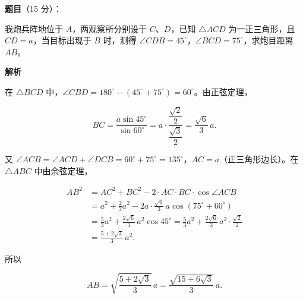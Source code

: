 \begin{answer}

\textbf{题目}（15 分）：

我炮兵阵地位于 $A$，两观察所分别设于 $C$、$D$，已知 $\triangle ACD$ 为一正三角形，且 $CD=a$，当目标出现于 $B$ 时，测得 $\angle CDB=45^\circ$，$\angle BCD=75^\circ$，求炮目距离 $AB$。
\nopagebreak[4]
\begin{center}\end{center}
\nopagebreak[4]
\textbf{解析}
\nopagebreak[4]
\begin{center}\end{center}
\nopagebreak[4]
在 $\triangle BCD$ 中，$\angle CBD=180^\circ-(45^\circ+75^\circ)=60^\circ$。由正弦定理，

\nopagebreak[4]
\[
BC=\frac{a\sin45^\circ}{\sin60^\circ}
=a\cdot\frac{\dfrac{\sqrt2}{2}}{\dfrac{\sqrt3}{2}}
=\frac{\sqrt6}{3}\,a.
\]

又 $\angle ACB=\angle ACD+\angle DCB=60^\circ+75^\circ=135^\circ$，$AC=a$（正三角形边长）。在 $\triangle ABC$ 中由余弦定理，

\nopagebreak[4]
\[
\begin{aligned}
AB^2&=AC^2+BC^2-2\cdot AC\cdot BC\cdot\cos\angle ACB\\
&=a^2+\frac23a^2-2a\cdot\frac{\sqrt6}{3}\,a\cos(75^\circ+60^\circ)\\
&=\frac53a^2+\frac{2\sqrt6}{3}\,a^2\cos45^\circ
=\frac53a^2+\frac{2\sqrt6}{3}\,a^2\cdot\frac{\sqrt2}{2}\\
&=\frac{5+2\sqrt3}{3}\,a^2.
\end{aligned}
\]

所以

\nopagebreak[4]
\[
AB=\sqrt{\frac{5+2\sqrt3}{3}}\,a
=\frac{\sqrt{15+6\sqrt3}}{3}\,a.
\]


\end{answer}
